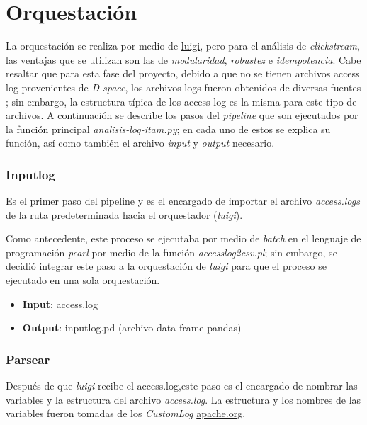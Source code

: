 \section{Orquestación}\label{orquestacion}

La orquestación se realiza por medio de \href{http://luigi.readthedocs.org/en/stable/}{luigi}, pero para el análisis de \emph{clickstream},  las ventajas que se utilizan son las de \emph{modularidad}, \emph{robustez} e \emph{idempotencia}. Cabe resaltar que para esta fase del proyecto, debido a que no se tienen archivos access log provenientes de \emph{D-space}, los archivos logs fueron obtenidos de diversas fuentes \citep{veterina}; sin embargo, la estructura típica de los access log es la misma para este tipo de archivos.
A continuación se describe los pasos del \emph{pipeline} que son ejecutados por la función principal \emph{analisis-log-itam.py}; en cada uno de estos se explica su función, así como también el archivo \emph{input} y \emph{output} necesario.


\subsubsection{ Inputlog}\label{i-inputlog}

Es el primer paso del pipeline y es el encargado de importar el archivo
\emph{access.logs} de la ruta predeterminada hacia el orquestador
(\emph{luigi}).

Como antecedente, este proceso se ejecutaba por medio de \emph{batch} en
el lenguaje de programación \emph{pearl} por medio de la función
\emph{accesslog2csv.pl}; sin embargo, se decidió integrar este paso a la
orquestación de \emph{luigi} para que el proceso se ejecutado en una
sola orquestación.


\begin{itemize}
\item \textbf{Input}: access.log
\item \textbf{Output}: inputlog.pd (archivo data frame pandas)
\end{itemize}




\subsubsection{ Parsear}\label{ii-parsear}

Después de que \emph{luigi} recibe el access.log,este paso es el
encargado de nombrar las variables y la estructura del archivo
\emph{access.log}. La estructura y los nombres de las variables fueron
tomadas de los \emph{CustomLog}
\href{https://httpd.apache.org/docs/2.2/logs.html}{apache.org}.

